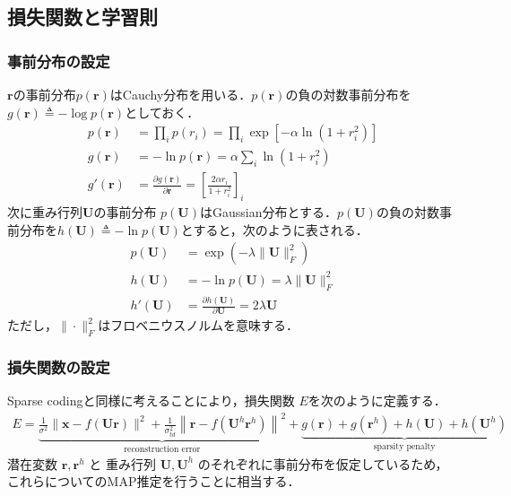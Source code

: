 \subsection{損失関数と学習則}
\subsubsection{事前分布の設定}
$\mathbf{r}$の事前分布$p(\mathbf{r})$はCauchy分布を用いる．$p(\mathbf{r})$の負の対数事前分布を$g(\mathbf{r})\triangleq-\log p(\mathbf{r})$としておく．
\begin{align}
p(\mathbf{r})&=\prod_i p(r_i)=\prod_i \exp\left[-\alpha \ln(1+r_i^2)\right]\\
g(\mathbf{r})&=-\ln p(\mathbf{r})=\alpha \sum_i \ln(1+r_i^2)\\
g'(\mathbf{r})&=\frac{\partial g(\mathbf{r})}{\partial \mathbf{r}}=\left[\frac{2\alpha r_i}{1+r_i^2}\right]_i
\end{align}
次に重み行列$\mathbf{U}$の事前分布 $p(\mathbf{U})$はGaussian分布とする．$p(\mathbf{U})$の負の対数事前分布を$h(\mathbf{U})\triangleq-\ln p(\mathbf{U})$とすると，次のように表される．
\begin{align}
p(\mathbf{U})&=\exp(-\lambda\|\mathbf{U}\|^2_F)\\
h(\mathbf{U})&=-\ln p(\mathbf{U})=\lambda\|\mathbf{U}\|^2_F\\
h'(\mathbf{U})&=\frac{\partial h(\mathbf{U})}{\partial \mathbf{U}}=2\lambda \mathbf{U}
\end{align}
ただし，$\|\cdot \| _ F^2$はフロベニウスノルムを意味する．
\subsubsection{損失関数の設定}
Sparse codingと同様に考えることにより，損失関数 $E$を次のように定義する．
\begin{align}
E=\underbrace{\frac{1}{\sigma^{2}}\|\mathbf{x}-f(\mathbf{U} \mathbf{r})\|^2+\frac{1}{\sigma_{t d}^{2}}\left\|\mathbf{r}-f(\mathbf{U}^h \mathbf{r}^h)\right\|^2}_{\text{reconstruction error}}+\underbrace{g(\mathbf{r})+g(\mathbf{r}^{h})+h(\mathbf{U})+h(\mathbf{U}^h)}_{\text{sparsity penalty}}
\end{align}
潜在変数 $\mathbf{r}, \mathbf{r}^h$ と 重み行列 $\mathbf{U}, \mathbf{U}^h$ のそれぞれに事前分布を仮定しているため，これらについてのMAP推定を行うことに相当する．
